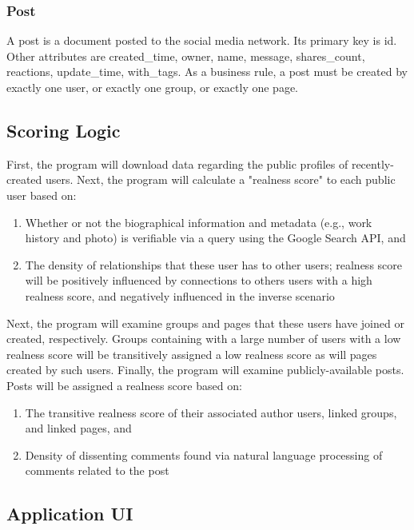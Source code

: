\documentclass{article}
\begin{document}
\subsubsection{Post}

A post is a document posted to the social media network. Its primary key is id. Other attributes are created_time, owner, name, message, shares_count, reactions, update_time, with_tags. As a business rule, a post must be created by exactly one user, or exactly one group, or exactly one page.

\subsection*{Scoring Logic}

First, the program will download data regarding the public profiles of recently-created users.  Next, the program will calculate a "realness score" to each public user based on:

\begin{enumerate}
\item Whether or not the biographical information and metadata (e.g., work history and photo) is verifiable via a query using the Google Search API, and
\item The density of relationships that these user has to other users; realness score will be positively influenced by connections to others users with a high realness score, and negatively influenced in the inverse scenario
\end{enumerate}

Next, the program will examine groups and pages that these users have joined or created, respectively. Groups containing with a large number of users with a low realness score will be transitively assigned a low realness score as will pages created by such users. Finally, the program will examine publicly-available posts. Posts will be assigned a realness score based on:

\begin{enumerate}
\item The transitive realness score of their associated author users, linked groups, and linked pages, and
\item Density of dissenting comments found via natural language processing of comments related to the post
\end{enumerate}

\subsection*{Application UI}
\end{document}
